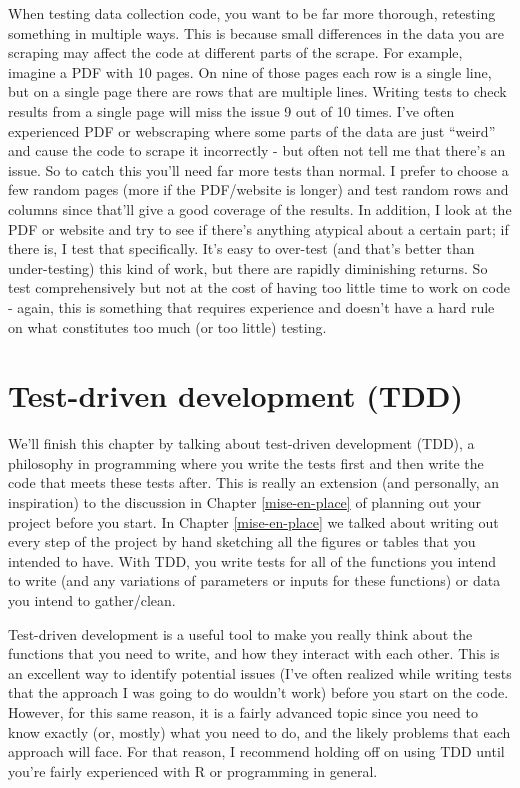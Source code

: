 \documentclass[
  12pt,
]{book}
\begin{document}
When testing data collection code, you want to be far more thorough, retesting something in multiple ways. This is because small differences in the data you are scraping may affect the code at different parts of the scrape. For example, imagine a PDF with 10 pages. On nine of those pages each row is a single line, but on a single page there are rows that are multiple lines. Writing tests to check results from a single page will miss the issue 9 out of 10 times. I've often experienced PDF or webscraping where some parts of the data are just ``weird'' and cause the code to scrape it incorrectly - but often not tell me that there's an issue. So to catch this you'll need far more tests than normal. I prefer to choose a few random pages (more if the PDF/website is longer) and test random rows and columns since that'll give a good coverage of the results. In addition, I look at the PDF or website and try to see if there's anything atypical about a certain part; if there is, I test that specifically. It's easy to over-test (and that's better than under-testing) this kind of work, but there are rapidly diminishing returns. So test comprehensively but not at the cost of having too little time to work on code - again, this is something that requires experience and doesn't have a hard rule on what constitutes too much (or too little) testing.

\hypertarget{test-driven-development-tdd}{%
\section{Test-driven development (TDD)}\label{test-driven-development-tdd}}

We'll finish this chapter by talking about test-driven development (TDD), a philosophy in programming where you write the tests first and then write the code that meets these tests after. This is really an extension (and personally, an inspiration) to the discussion in Chapter \ref{mise-en-place} of planning out your project before you start. In Chapter \ref{mise-en-place} we talked about writing out every step of the project by hand sketching all the figures or tables that you intended to have. With TDD, you write tests for all of the functions you intend to write (and any variations of parameters or inputs for these functions) or data you intend to gather/clean.

Test-driven development is a useful tool to make you really think about the functions that you need to write, and how they interact with each other. This is an excellent way to identify potential issues (I've often realized while writing tests that the approach I was going to do wouldn't work) before you start on the code. However, for this same reason, it is a fairly advanced topic since you need to know exactly (or, mostly) what you need to do, and the likely problems that each approach will face. For that reason, I recommend holding off on using TDD until you're fairly experienced with R or programming in general.
\end{document}
